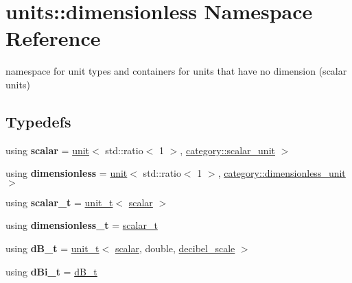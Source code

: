 \hypertarget{namespaceunits_1_1dimensionless}{}\section{units\+:\+:dimensionless Namespace Reference}
\label{namespaceunits_1_1dimensionless}


namespace for unit types and containers for units that have no dimension (scalar units)  


\subsection*{Typedefs}
\begin{DoxyCompactItemize}
\item 
\hypertarget{namespaceunits_1_1dimensionless_ae7156ae222ecb29639b38f2cb588fed9}{}using {\bfseries scalar} = \hyperlink{structunits_1_1unit}{unit}$<$ std\+::ratio$<$ 1 $>$, \hyperlink{namespaceunits_1_1category_ad633be0ea9f0ebaefb2a648244a5d816}{category\+::scalar\+\_\+unit} $>$\label{namespaceunits_1_1dimensionless_ae7156ae222ecb29639b38f2cb588fed9}

\item 
\hypertarget{namespaceunits_1_1dimensionless_a52f475e410526a743dd7f418bcd4323c}{}using {\bfseries dimensionless} = \hyperlink{structunits_1_1unit}{unit}$<$ std\+::ratio$<$ 1 $>$, \hyperlink{namespaceunits_1_1category_a70d9cdc2326b265921b36493485b1254}{category\+::dimensionless\+\_\+unit} $>$\label{namespaceunits_1_1dimensionless_a52f475e410526a743dd7f418bcd4323c}

\item 
\hypertarget{namespaceunits_1_1dimensionless_a7bc42a355a7f61b4525bf3e5c403fc2d}{}using {\bfseries scalar\+\_\+t} = \hyperlink{classunits_1_1unit__t}{unit\+\_\+t}$<$ \hyperlink{structunits_1_1unit}{scalar} $>$\label{namespaceunits_1_1dimensionless_a7bc42a355a7f61b4525bf3e5c403fc2d}

\item 
\hypertarget{namespaceunits_1_1dimensionless_a6da44f035e71ad6cdad5f7441f094096}{}using {\bfseries dimensionless\+\_\+t} = \hyperlink{classunits_1_1unit__t}{scalar\+\_\+t}\label{namespaceunits_1_1dimensionless_a6da44f035e71ad6cdad5f7441f094096}

\item 
\hypertarget{namespaceunits_1_1dimensionless_a2f2a733278d2a031068460eeb60f2e02}{}using {\bfseries d\+B\+\_\+t} = \hyperlink{classunits_1_1unit__t}{unit\+\_\+t}$<$ \hyperlink{structunits_1_1unit}{scalar}, double, \hyperlink{structunits_1_1decibel__scale}{decibel\+\_\+scale} $>$\label{namespaceunits_1_1dimensionless_a2f2a733278d2a031068460eeb60f2e02}

\item 
\hypertarget{namespaceunits_1_1dimensionless_af60a38603216d7cd17c20f67903361bd}{}using {\bfseries d\+Bi\+\_\+t} = \hyperlink{classunits_1_1unit__t}{d\+B\+\_\+t}\label{namespaceunits_1_1dimensionless_af60a38603216d7cd17c20f67903361bd}

\end{DoxyCompactItemize}


